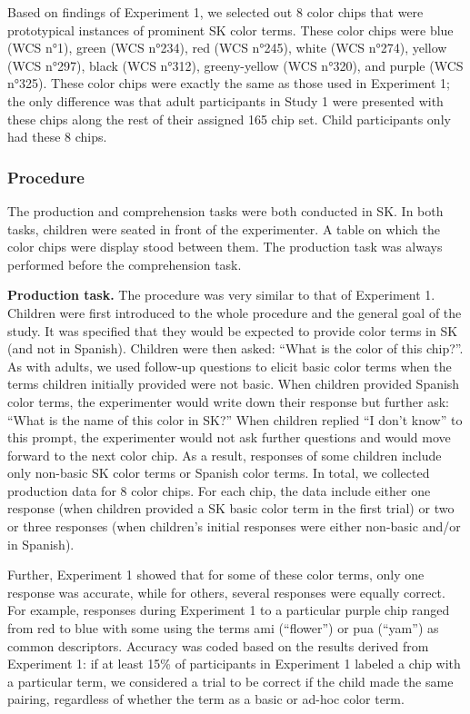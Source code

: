 \documentclass[,man,floatsintext]{apa6}
\theoremstyle{definition}
\theoremstyle{definition}
\theoremstyle{definition}
\theoremstyle{remark}
\begin{document}
Based on findings of Experiment 1, we selected out 8 color chips that
were prototypical instances of prominent SK color terms. These color
chips were blue (WCS n°1), green (WCS n°234), red (WCS n°245), white
(WCS n°274), yellow (WCS n°297), black (WCS n°312), greeny-yellow (WCS
n°320), and purple (WCS n°325). These color chips were exactly the same
as those used in Experiment 1; the only difference was that adult
participants in Study 1 were presented with these chips along the rest
of their assigned 165 chip set. Child participants only had these 8
chips.

\subsubsection{Procedure}\label{procedure-1}

The production and comprehension tasks were both conducted in SK. In
both tasks, children were seated in front of the experimenter. A table
on which the color chips were display stood between them. The production
task was always performed before the comprehension task.

\textbf{Production task.} The procedure was very similar to that of
Experiment 1. Children were first introduced to the whole procedure and
the general goal of the study. It was specified that they would be
expected to provide color terms in SK (and not in Spanish). Children
were then asked: \enquote{What is the color of this chip?}. As with
adults, we used follow-up questions to elicit basic color terms when the
terms children initially provided were not basic. When children provided
Spanish color terms, the experimenter would write down their response
but further ask: \enquote{What is the name of this color in SK?} When
children replied \enquote{I don't know} to this prompt, the experimenter
would not ask further questions and would move forward to the next color
chip. As a result, responses of some children include only non-basic SK
color terms or Spanish color terms. In total, we collected production
data for 8 color chips. For each chip, the data include either one
response (when children provided a SK basic color term in the first
trial) or two or three responses (when children's initial responses were
either non-basic and/or in Spanish).

Further, Experiment 1 showed that for some of these color terms, only
one response was accurate, while for others, several responses were
equally correct. For example, responses during Experiment 1 to a
particular purple chip ranged from red to blue with some using the terms
ami (\enquote{flower}) or pua (\enquote{yam}) as common descriptors.
Accuracy was coded based on the results derived from Experiment 1: if at
least 15\% of participants in Experiment 1 labeled a chip with a
particular term, we considered a trial to be correct if the child made
the same pairing, regardless of whether the term as a basic or ad-hoc
color term.
\end{document}
